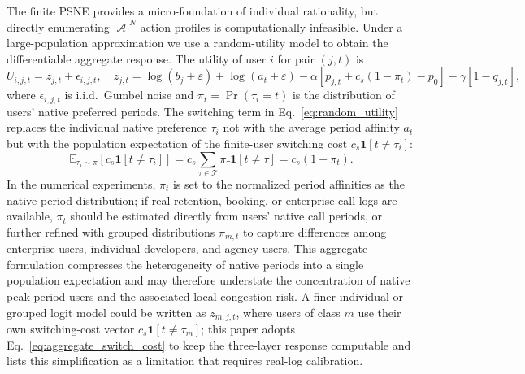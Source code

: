 \documentclass[11pt,a4paper]{article}
\newcommand{\T}{\mathcal{T}}
\newcommand{\A}{\mathcal{A}}
\begin{document}
The finite PSNE provides a micro-foundation of individual rationality, but directly enumerating $|\A|^N$ action profiles is computationally infeasible. Under a large-population approximation we use a random-utility model to obtain the differentiable aggregate response. The utility of user $i$ for pair $(j,t)$ is
\begin{equation}
  U_{i,j,t}=z_{j,t}+\epsilon_{i,j,t},
  \quad
  z_{j,t}=\log(b_j+\varepsilon)+\log(a_t+\varepsilon)
  -\alpha\left[p_{j,t}+c_s(1-\pi_t)-p_0\right]
  -\gamma[1-q_{j,t}],
  \label{eq:random_utility}
\end{equation}
where $\epsilon_{i,j,t}$ is i.i.d.\ Gumbel noise and $\pi_t=\Pr(\tau_i=t)$ is the distribution of users' native preferred periods. The switching term in Eq.~\eqref{eq:random_utility} replaces the individual native preference $\tau_i$ not with the average period affinity $a_t$ but with the population expectation of the finite-user switching cost $c_s\mathbf{1}[t\ne\tau_i]$:
\begin{equation}
  \mathbb{E}_{\tau_i\sim\pi}\!\left[c_s\mathbf{1}[t\ne\tau_i]\right]
  =c_s\sum_{\tau\in\T}\pi_\tau\mathbf{1}[t\ne\tau]
  =c_s(1-\pi_t).
  \label{eq:aggregate_switch_cost}
\end{equation}
In the numerical experiments, $\pi_t$ is set to the normalized period affinities as the native-period distribution; if real retention, booking, or enterprise-call logs are available, $\pi_t$ should be estimated directly from users' native call periods, or further refined with grouped distributions $\pi_{m,t}$ to capture differences among enterprise users, individual developers, and agency users. This aggregate formulation compresses the heterogeneity of native periods into a single population expectation and may therefore understate the concentration of native peak-period users and the associated local-congestion risk. A finer individual or grouped logit model could be written as $z_{m,j,t}$, where users of class $m$ use their own switching-cost vector $c_s\mathbf{1}[t\ne\tau_m]$; this paper adopts Eq.~\eqref{eq:aggregate_switch_cost} to keep the three-layer response computable and lists this simplification as a limitation that requires real-log calibration.
\end{document}
